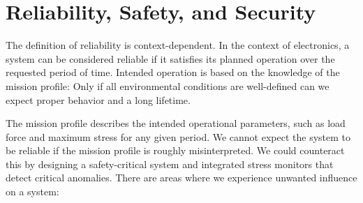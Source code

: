 

\section{Reliability, Safety, and Security}
\label{sec:reliability-safety-security}

The definition of reliability is context-dependent.
In the context of electronics, a system can be considered reliable if it
satisfies its planned operation over the requested period of time.
Intended operation is based on the knowledge of the mission profile: Only if all
environmental conditions are well-defined can we expect proper behavior and a
long lifetime.

The mission profile describes the intended operational parameters, such as
load force and maximum stress for any given period.
We cannot expect the system to be reliable if the mission profile is roughly
misinterpreted.
We could counteract this by designing a safety-critical system and integrated
stress monitors that detect critical anomalies.
There are areas where we experience unwanted influence on a system:

